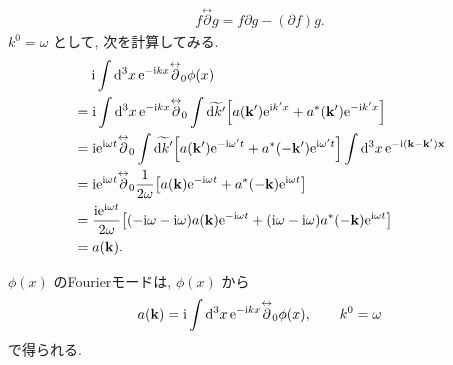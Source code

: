 \documentclass[../note01.tex]{subfiles}
\begin{document}
\begin{align}
    f\overset{\leftrightarrow}{\partial} g = f\partial g - (\partial f)g.
\end{align}
$ k^0=\omega $ として, 次を計算してみる.
\begin{align*}
    &\quad\;\mathrm{i}\int\dd[3]{x} \mathrm{e}^{-\mathrm{i} kx}\overset{\leftrightarrow}{\partial}_0\phi(x) \\
    &= \mathrm{i}\int\dd[3]{x} \mathrm{e}^{-\mathrm{i} kx}\overset{\leftrightarrow}{\partial}_0 \int\widetilde{\dd{k'}} \qty[a(\vb{k}')\mathrm{e}^{\mathrm{i} k'x} + a^*(\vb{k}')\mathrm{e}^{-\mathrm{i} k'x}] \\
    &= \mathrm{i}\mathrm{e}^{\mathrm{i}\omega t}\overset{\leftrightarrow}{\partial}_0 \int\widetilde{\dd{k}'} \qty[a(\vb{k}')\mathrm{e}^{-\mathrm{i}\omega't} + a^*(-\vb{k}')\mathrm{e}^{\mathrm{i}\omega't}] \int\dd[3]{x}\mathrm{e}^{-\mathrm{i}(\vb{k}-\vb{k}')\vb{x}} \\
    &= \mathrm{i}\mathrm{e}^{\mathrm{i}\omega t}\overset{\leftrightarrow}{\partial}_0 \frac{1}{2\omega} \qty[a(\vb{k})\mathrm{e}^{-\mathrm{i}\omega t} + a^*(-\vb{k})\mathrm{e}^{\mathrm{i}\omega t}] \\
    &= \frac{\mathrm{i}\mathrm{e}^{\mathrm{i}\omega t}}{2\omega} \qty[(-\mathrm{i}\omega-\mathrm{i}\omega)a(\vb{k})\mathrm{e}^{-\mathrm{i}\omega t} + (\mathrm{i}\omega-\mathrm{i}\omega)a^*(\vb{-k})\mathrm{e}^{\mathrm{i}\omega t}] \\
    &= a(\vb{k}).
\end{align*}
\begin{kekka}
    $ \phi(x) $ のFourierモードは, $ \phi(x) $ から
    \begin{align}\label{mode}
        a(\vb{k}) = \mathrm{i}\int\dd[3]{x} \mathrm{e}^{-\mathrm{i} kx}\overset{\leftrightarrow}{\partial}_0\phi(x), \qquad k^0=\omega
    \end{align}
    で得られる.
\end{kekka}
\end{document}

